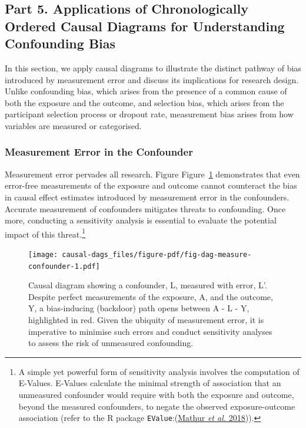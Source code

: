 \documentclass[
  singlecolumn]{article}
\begin{document}
\hypertarget{part-5.-applications-of-chronologically-ordered-causal-diagrams-for-understanding-confounding-bias}{%
\subsection{Part 5. Applications of Chronologically Ordered Causal
Diagrams for Understanding Confounding
Bias}\label{part-5.-applications-of-chronologically-ordered-causal-diagrams-for-understanding-confounding-bias}}

In this section, we apply causal diagrams to illustrate the distinct
pathway of bias introduced by measurement error and discuss its
implications for research design. Unlike confounding bias, which arises
from the presence of a common cause of both the exposure and the
outcome, and selection bias, which arises from the participant selection
process or dropout rate, measurement bias arises from how variables are
measured or categorised.

\hypertarget{measurement-error-in-the-confounder}{%
\subsubsection{Measurement Error in the
Confounder}\label{measurement-error-in-the-confounder}}

Measurement error pervades all research. Figure
Figure~\ref{fig-dag-measure-confounder} demonstrates that even
error-free measurements of the exposure and outcome cannot counteract
the bias in causal effect estimates introduced by measurement error in
the confounders. Accurate measurement of confounders mitigates threats
to confounding. Once more, conducting a sensitivity analysis is
essential to evaluate the potential impact of this threat.\footnote{A
  simple yet powerful form of sensitivity analysis involves the
  computation of E-Values. E-Values calculate the minimal strength of
  association that an unmeasured confounder would require with both the
  exposure and outcome, beyond the measured confounders, to negate the
  observed exposure-outcome association (refer to the R package
  \texttt{EValue}:(\protect\hyperlink{ref-mathur2018}{Mathur \emph{et
  al.} 2018})).}

\begin{figure}

{\centering \texttt{[image: causal-dags\_files/figure-pdf/fig-dag-measure-confounder-1.pdf]}

}

\caption{\label{fig-dag-measure-confounder}Causal diagram showing a
confounder, L, measured with error, L'. Despite perfect measurements of
the exposure, A, and the outcome, Y, a bias-inducing (backdoor) path
opens between A - L - Y, highlighted in red. Given the ubiquity of
measurement error, it is imperative to minimise such errors and conduct
sensitivity analyses to assess the risk of unmeasured confounding.}

\end{figure}
\end{document}
